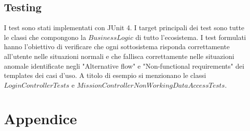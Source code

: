 \documentclass{article}
\begin{document}
    \newpage
    \subsection{Testing}
    I test sono stati implementati con JUnit 4.
    I target principali dei test sono tutte le classi che compongono la $BusinessLogic$ di tutto l'ecosistema.
    I test formulati hanno l'obiettivo di verificare che ogni sottosistema risponda correttamente all'utente nelle situazioni normali e che fallisca correttamente nelle situazioni
    anomale identificate negli "Alternative flow" e "Non-functional requirements" dei templates dei casi d'uso.
    A titolo di esempio si menzionano le classi $LoginControllerTests$ e \newline $MissionControllerNonWorkingDataAccessTests$.


    \section{Appendice}
\end{document}
